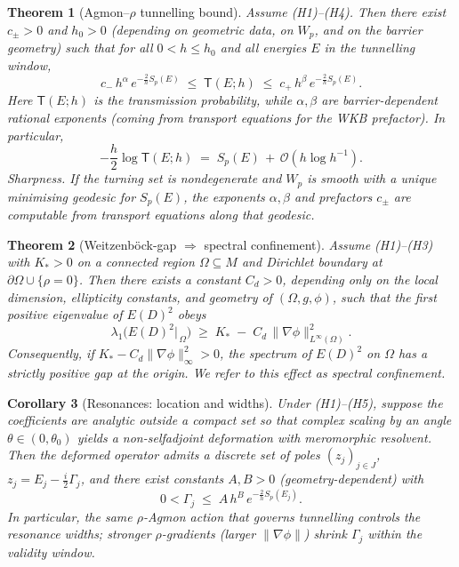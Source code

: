 \documentclass[11pt]{article}
\newtheorem{theorem}{Theorem}[section]
\newtheorem{corollary}[theorem]{Corollary}
\theoremstyle{definition}
\begin{document}
	\begin{theorem}[Agmon--$\rho$ tunnelling bound]\label{thm:agmon-rho}
		Assume \textup{(H1)--(H4)}. Then there exist $c_\pm>0$ and $h_0>0$ (depending on geometric data, on $W_p$, and on the barrier geometry) such that for all $0<h\le h_0$ and all energies $E$ in the tunnelling window,
		\[
		c_-\,h^{\alpha}\,e^{-\tfrac{2}{h}S_p(E)} 
		\;\le\; \mathsf{T}(E;h) 
		\;\le\; c_+\,h^{\beta}\,e^{-\tfrac{2}{h}S_p(E)}.
		\]
		Here $\mathsf{T}(E;h)$ is the transmission probability, while $\alpha,\beta$ are barrier-dependent rational exponents (coming from transport equations for the WKB prefactor).
		In particular,
		\[
		-\frac{h}{2}\log \mathsf{T}(E;h)\;=\; S_p(E)\,+\,\mathcal{O}(h\log h^{-1}).
		\]
		\emph{Sharpness.} If the turning set is nondegenerate and $W_p$ is smooth with a unique minimising geodesic for $S_p(E)$, the exponents $\alpha,\beta$ and prefactors $c_\pm$ are computable from transport equations along that geodesic.
	\end{theorem}
	
	\begin{theorem}[Weitzenböck-gap $\Rightarrow$ spectral confinement]\label{thm:weitzenbock-gap}
		Assume \textup{(H1)--(H3)} with $K_\ast>0$ on a connected region $\Omega\subseteq M$ and Dirichlet boundary at $\partial\Omega\cup\{\rho=0\}$. Then there exists a constant $C_d>0$, depending only on the local dimension, ellipticity constants, and geometry of $(\Omega,g,\phi)$, such that the first positive eigenvalue of $E(D)^2$ obeys
		\[
		\lambda_1\big(E(D)^2\vert_{\,\Omega}\big)\;\ge\; K_\ast \;-\; C_d\,\|\nabla\phi\|_{L^\infty(\Omega)}^{2}.
		\]
		Consequently, if $K_\ast - C_d\|\nabla\phi\|_\infty^{2}>0$, the spectrum of $E(D)^2$ on $\Omega$ has a strictly positive gap at the origin.
		We refer to this effect as \emph{spectral confinement}.
	\end{theorem}
	
	\begin{corollary}[Resonances: location and widths]\label{cor:resonances}
		Under \textup{(H1)--(H5)}, suppose the coefficients are analytic outside a compact set so that complex scaling by an angle $\theta\in(0,\theta_0)$ yields a non-selfadjoint deformation with meromorphic resolvent.
		Then the deformed operator admits a discrete set of poles $(z_j)_{j\in J}$, $z_j=E_j - \tfrac{i}{2}\Gamma_j$, and there exist constants $A,B>0$ (geometry-dependent) with
		\[
		0<\Gamma_j \;\le\; A\,h^{B}\,e^{-\tfrac{2}{h}S_p(E_j)}.
		\]
		In particular, the same $\rho$-Agmon action that governs tunnelling controls the resonance widths; stronger $\rho$-gradients (larger $\|\nabla\phi\|$) shrink $\Gamma_j$ within the validity window.
	\end{corollary}
	
\end{document}
